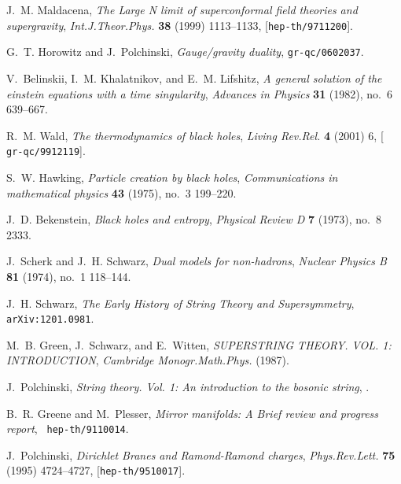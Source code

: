 \documentclass[12pt]{article}
\begin{document}
\providecommand{\href}[2]{#2}\begingroup\raggedright\begin{thebibliography}{100}

J.~M. Maldacena, {\it {The Large N limit of superconformal field theories and
  supergravity}},  {\em Int.J.Theor.Phys.} {\bf 38} (1999) 1113--1133,
  [\href{http://xxx.lanl.gov/abs/hep-th/9711200}{{\tt hep-th/9711200}}].

G.~T. Horowitz and J.~Polchinski, {\it {Gauge/gravity duality}},
  \href{http://xxx.lanl.gov/abs/gr-qc/0602037}{{\tt gr-qc/0602037}}.

V.~Belinskii, I.~M. Khalatnikov, and E.~M. Lifshitz, {\it A general solution of
  the einstein equations with a time singularity},  {\em Advances in Physics}
  {\bf 31} (1982), no.~6 639--667.

R.~M. Wald, {\it {The thermodynamics of black holes}},  {\em Living Rev.Rel.}
  {\bf 4} (2001) 6, [\href{http://xxx.lanl.gov/abs/gr-qc/9912119}{{\tt
  gr-qc/9912119}}].

S.~W. Hawking, {\it Particle creation by black holes},  {\em Communications in
  mathematical physics} {\bf 43} (1975), no.~3 199--220.

J.~D. Bekenstein, {\it Black holes and entropy},  {\em Physical Review D} {\bf
  7} (1973), no.~8 2333.

J.~Scherk and J.~H. Schwarz, {\it Dual models for non-hadrons},  {\em Nuclear
  Physics B} {\bf 81} (1974), no.~1 118--144.

J.~H. Schwarz, {\it {The Early History of String Theory and Supersymmetry}},
  \href{http://xxx.lanl.gov/abs/1201.0981}{{\tt arXiv:1201.0981}}.

M.~B. Green, J.~Schwarz, and E.~Witten, {\it {SUPERSTRING THEORY. VOL. 1:
  INTRODUCTION}},  {\em Cambridge Monogr.Math.Phys.} (1987).

J.~Polchinski, {\it {String theory. Vol. 1: An introduction to the bosonic
  string}}, .

B.~R. Greene and M.~Plesser, {\it {Mirror manifolds: A Brief review and
  progress report}},  \href{http://xxx.lanl.gov/abs/hep-th/9110014}{{\tt
  hep-th/9110014}}.

J.~Polchinski, {\it {Dirichlet Branes and Ramond-Ramond charges}},  {\em
  Phys.Rev.Lett.} {\bf 75} (1995) 4724--4727,
  [\href{http://xxx.lanl.gov/abs/hep-th/9510017}{{\tt hep-th/9510017}}].


\end{thebibliography}
\end{document}
